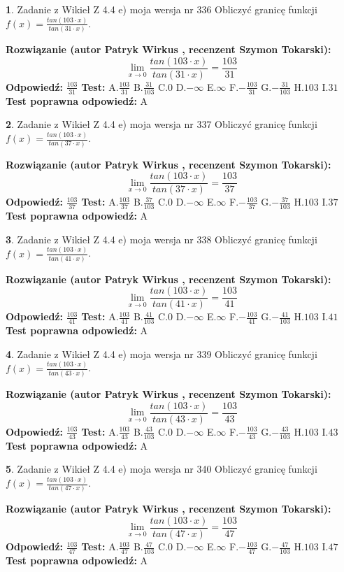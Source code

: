 \documentclass[12pt, a4paper]{article}
\theoremstyle{definition} %
\newtheorem{zad}{}
\newcommand{\zadStart}[1]{\begin{zad}#1\newline}
\newcommand{\zadStop}{\end{zad}}
\newcommand{\rozwStart}[2]{\noindent \textbf{Rozwiązanie (autor #1 , recenzent #2): }\newline}
\newcommand{\rozwStop}{\newline}
\newcommand{\odpStart}{\noindent \textbf{Odpowiedź:}\newline}
\newcommand{\odpStop}{\newline}
\newcommand{\testStart}{\noindent \textbf{Test:}\newline}
\newcommand{\testStop}{\newline}
\newcommand{\kluczStart}{\noindent \textbf{Test poprawna odpowiedź:}\newline}
\newcommand{\kluczStop}{\newline}
\begin{document}
\zadStart{Zadanie z Wikieł Z 4.4 e) moja wersja nr 336}
Obliczyć granicę funkcji $f(x)=\frac{tan(103\cdot x)}{tan(31\cdot x)}$.
\zadStop
\rozwStart{Patryk Wirkus}{Szymon Tokarski}
$$\lim\limits_{x\to 0}\frac{tan(103\cdot x)}{tan(31\cdot x)}=
\frac{103}{31}$$
\rozwStop
\odpStart
$\frac{103}{31}$
\odpStop
\testStart
A.$\frac{103}{31}$
B.$\frac{31}{103}$
C.$0$
D.$-\infty$
E.$\infty$
F.$-\frac{103}{31}$
G.$-\frac{31}{103}$
H.$103$
I.$31$
\testStop
\kluczStart
A
\kluczStop



\zadStart{Zadanie z Wikieł Z 4.4 e) moja wersja nr 337}
Obliczyć granicę funkcji $f(x)=\frac{tan(103\cdot x)}{tan(37\cdot x)}$.
\zadStop
\rozwStart{Patryk Wirkus}{Szymon Tokarski}
$$\lim\limits_{x\to 0}\frac{tan(103\cdot x)}{tan(37\cdot x)}=
\frac{103}{37}$$
\rozwStop
\odpStart
$\frac{103}{37}$
\odpStop
\testStart
A.$\frac{103}{37}$
B.$\frac{37}{103}$
C.$0$
D.$-\infty$
E.$\infty$
F.$-\frac{103}{37}$
G.$-\frac{37}{103}$
H.$103$
I.$37$
\testStop
\kluczStart
A
\kluczStop



\zadStart{Zadanie z Wikieł Z 4.4 e) moja wersja nr 338}
Obliczyć granicę funkcji $f(x)=\frac{tan(103\cdot x)}{tan(41\cdot x)}$.
\zadStop
\rozwStart{Patryk Wirkus}{Szymon Tokarski}
$$\lim\limits_{x\to 0}\frac{tan(103\cdot x)}{tan(41\cdot x)}=
\frac{103}{41}$$
\rozwStop
\odpStart
$\frac{103}{41}$
\odpStop
\testStart
A.$\frac{103}{41}$
B.$\frac{41}{103}$
C.$0$
D.$-\infty$
E.$\infty$
F.$-\frac{103}{41}$
G.$-\frac{41}{103}$
H.$103$
I.$41$
\testStop
\kluczStart
A
\kluczStop



\zadStart{Zadanie z Wikieł Z 4.4 e) moja wersja nr 339}
Obliczyć granicę funkcji $f(x)=\frac{tan(103\cdot x)}{tan(43\cdot x)}$.
\zadStop
\rozwStart{Patryk Wirkus}{Szymon Tokarski}
$$\lim\limits_{x\to 0}\frac{tan(103\cdot x)}{tan(43\cdot x)}=
\frac{103}{43}$$
\rozwStop
\odpStart
$\frac{103}{43}$
\odpStop
\testStart
A.$\frac{103}{43}$
B.$\frac{43}{103}$
C.$0$
D.$-\infty$
E.$\infty$
F.$-\frac{103}{43}$
G.$-\frac{43}{103}$
H.$103$
I.$43$
\testStop
\kluczStart
A
\kluczStop



\zadStart{Zadanie z Wikieł Z 4.4 e) moja wersja nr 340}
Obliczyć granicę funkcji $f(x)=\frac{tan(103\cdot x)}{tan(47\cdot x)}$.
\zadStop
\rozwStart{Patryk Wirkus}{Szymon Tokarski}
$$\lim\limits_{x\to 0}\frac{tan(103\cdot x)}{tan(47\cdot x)}=
\frac{103}{47}$$
\rozwStop
\odpStart
$\frac{103}{47}$
\odpStop
\testStart
A.$\frac{103}{47}$
B.$\frac{47}{103}$
C.$0$
D.$-\infty$
E.$\infty$
F.$-\frac{103}{47}$
G.$-\frac{47}{103}$
H.$103$
I.$47$
\testStop
\kluczStart
A
\kluczStop
\end{document}
